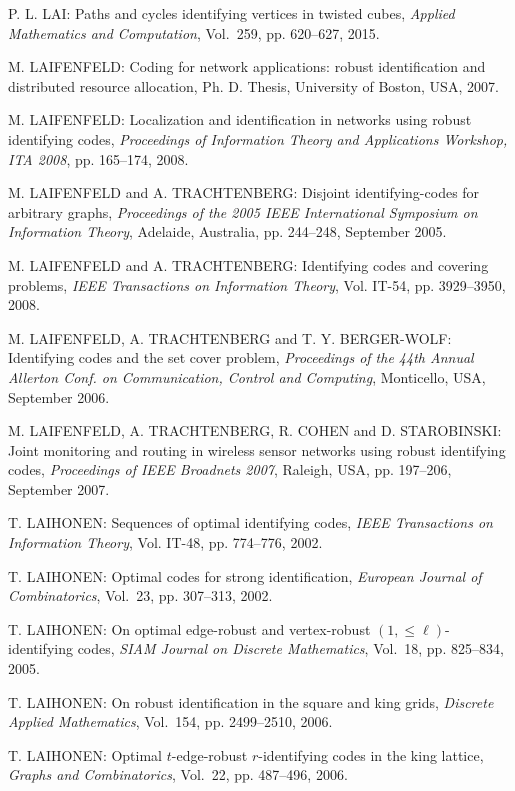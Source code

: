 \begin{thebibliography}{999}
P. L. LAI: Paths and cycles identifying vertices in twisted cubes, {\it Applied Mathematics and Computation}, Vol.~259, pp. 620--627, 2015.

M. LAIFENFELD: Coding for network applications: robust identification and distributed resource allocation, Ph. D. Thesis, University of Boston, USA, 2007.

M. LAIFENFELD: Localization and identification in networks using robust identifying codes, {\it Proceedings of Information Theory and Applications Workshop, ITA 2008}, pp. 165--174, 2008.

M. LAIFENFELD and A. TRACHTENBERG: Disjoint identifying-codes for arbitrary graphs, {\it Proceedings of the 2005 IEEE International Symposium on Information Theory}, Adelaide, Australia, pp. 244--248, September 2005.

M. LAIFENFELD and A. TRACHTENBERG: Identifying codes and covering problems, {\it IEEE Transactions on Information Theory}, Vol. IT-54, pp. 3929--3950, 2008.

M. LAIFENFELD, A. TRACHTENBERG and T. Y. BERGER-WOLF: Identifying codes and the set cover problem, {\it Proceedings of the 44th Annual Allerton Conf. on Communication, Control and Computing}, Monticello, USA, September 2006.

M. LAIFENFELD, A. TRACHTENBERG, R. COHEN and D. STARO\-BINSKI: Joint monitoring and routing in wireless sensor networks using robust identifying codes, {\it Proceedings of IEEE Broadnets 2007}, Raleigh, USA, pp. 197--206, September 2007.

T. LAIHONEN: Sequences of optimal identifying codes, {\it IEEE Transactions on Information Theory}, Vol. IT-48, pp. 774--776, 2002.

T. LAIHONEN: Optimal codes for strong identification, {\it European Journal of Combinatorics}, Vol.~23, pp. 307--313, 2002.

T. LAIHONEN: On optimal edge-robust and vertex-robust $(1,\leq\ell)$-identifying codes, {\it SIAM Journal on Discrete Mathematics}, Vol.~18, pp. 825--834, 2005.

T. LAIHONEN: On robust identification in the square and king grids, {\it Discrete Applied Mathematics}, Vol.~154, pp. 2499--2510, 2006.


T. LAIHONEN: Optimal $t$-edge-robust $r$-identifying codes in the king lattice, {\it Graphs and Combinatorics}, Vol.~22, pp. 487--496, 2006.


\end{thebibliography}
